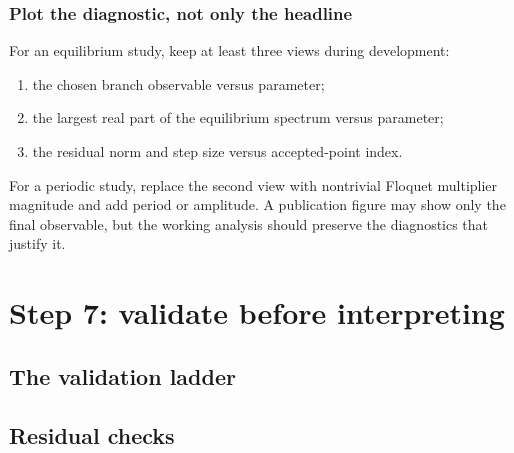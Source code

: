 \documentclass[11pt,oneside]{book}
\begin{document}
\subsection{Plot the diagnostic, not only the headline}

For an equilibrium study, keep at least three views during development:

\begin{enumerate}
  \item the chosen branch observable versus parameter;
  \item the largest real part of the equilibrium spectrum versus parameter;
  \item the residual norm and step size versus accepted-point index.
\end{enumerate}

For a periodic study, replace the second view with nontrivial Floquet
multiplier magnitude and add period or amplitude. A publication figure may
show only the final observable, but the working analysis should preserve the
diagnostics that justify it.

\chapter{Step 7: validate before interpreting}

\section{The validation ladder}

\begin{center}
\end{center}

\section{Residual checks}
\end{document}
